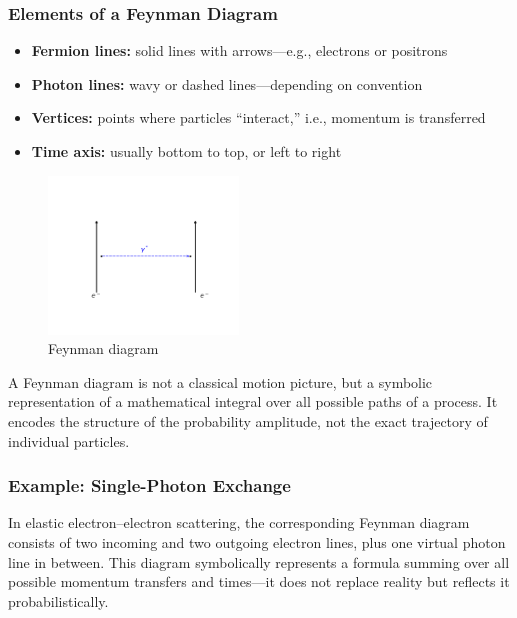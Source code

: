 \subsubsection*{Elements of a Feynman Diagram}
\begin{itemize}
	\item \textbf{Fermion lines:} solid lines with arrows—e.g., electrons or positrons
	\item \textbf{Photon lines:} wavy or dashed lines—depending on convention
	\item \textbf{Vertices:} points where particles “interact,” i.e., momentum is transferred
	\item \textbf{Time axis:} usually bottom to top, or left to right
\end{itemize}
\begin{figure}[H]
	\begin{center}
		\includegraphics[width=0.45\textwidth]{bilder/feynman-einphoton.pdf}
	\end{center}
	\caption{Feynman diagram}
\end{figure}
\newpage
\noindent
\vspace{0.5em}
\begin{tcolorbox}[physikbox, title=What a Feynman Diagram Really Shows]
	\label{box:Was ein Feynman-Diagramm}
	A Feynman diagram is not a classical motion picture, but a symbolic representation of a mathematical integral over all possible paths of a process. It encodes the structure of the probability amplitude, not the exact trajectory of individual particles.
\end{tcolorbox}

\subsubsection*{Example: Single-Photon Exchange}
In elastic electron–electron scattering, the corresponding Feynman diagram consists of two incoming and two outgoing electron lines, plus one virtual photon line in between. This diagram symbolically represents a formula summing over all possible momentum transfers and times—it does not replace reality but reflects it probabilistically.

